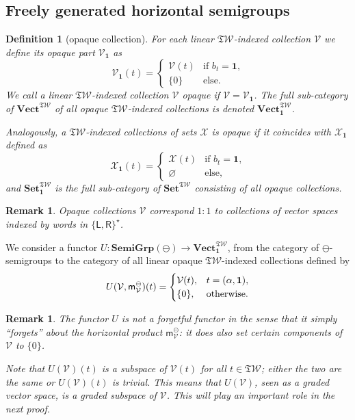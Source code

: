 \documentclass[pdftex]{sigma}
\newcommand{\SWc}{{\mathfrak{T}\mathcal{W}}}
\newcommand\hp{\mathsf{m}^{\ominus}}
\newcommand\LL{{\mathsf{L}}}
\newcommand\RR{{\mathsf{R}}}
\newcommand\CAT[1]{\mathbf{#1}}
\newcommand{\Vect}{\CAT{Vect}}
\newcommand{\Set}{\CAT{Set}}
\newcommand\sgominus{\CAT{SemiGrp}(\ominus)}
\newcommand\icsw{ \Vect^{\SWc} }
\numberwithin{equation}{section}
\newtheorem{Definition}[Theorem]{Definition}
\newtheorem{Remark}[Theorem]{Remark}
\begin{document}
\subsection{Freely generated horizontal semigroups}
\label{subsec:freely-generated-ominus-semigroups}

\begin{Definition}[opaque collection]
 For each linear $\SWc$-indexed collection $\mathcal V$ we define its {\it opaque part} $\mathcal V_{\mathbf 1}$ as
 \[\mathcal V_{\mathbf 1}(t)=
 \begin{cases}
 \mathcal V(t)&\text{if $b_t=\mathbf 1$,}\\
 \{0\} &\text{else.}
 \end{cases}
 \]
	We call a linear $\SWc$-indexed collection $\mathcal{V}$ {\it opaque} if
	$\mathcal V=\mathcal V_{\mathbf 1}$.
	The full sub-category of $\icsw$ of all opaque $\SWc$-indexed collections is denoted $\icsw_{\mathbf{1}}$.

 Analogously, a $\SWc$-indexed collections of sets $\mathcal X$ is opaque if it coincides with $\mathcal X_{\mathbf 1}$ defined as
 \[\mathcal X_{\mathbf 1}(t)=
 \begin{cases}
 \mathcal X(t)&\text{if $b_t=\mathbf 1$,}\\
 \varnothing &\text{else},
 \end{cases}
 \]
 and $\Set^\SWc_{\mathbf 1}$ is the full sub-category of $\Set^\SWc$ consisting of all opaque collections.
\end{Definition}
\begin{Remark}
 Opaque collections $\mathcal{V}$ correspond $1:1$ to collections of vector spaces indexed by words in $\{\LL,\RR\}^{\star}$.
\end{Remark}
We consider a functor $U\colon\sgominus\to \icsw_{\mathbf{1}}$, from the category of $\ominus$-semigroups to the category of all linear opaque $\SWc$-indexed collections defined by
\[
U(\mathcal{V}, \hp_{\mathcal{V}})(t)= \begin{cases} \mathcal{V} (t), & t=(\alpha,{\bf 1}), \\ \{0\}, & \text{otherwise}. \end{cases}
\]
\begin{Remark}
 \label{rmq:graded-subspace}
 The functor $U$ is not a forgetful functor in the sense that it simply ``forgets'' about the horizontal product $\hp_{\mathcal{V}}$: it does also set certain components of $\mathcal{V}$ to $\{0\}$.

 Note that $U(\mathcal V)(t)$ is a subspace of $\mathcal V(t)$ for all $t\in \SWc$; either the two are the same or $U(\mathcal V)(t)$ is trivial. This means that $U(\mathcal V)$, seen as a graded vector space, is a graded subspace of $\mathcal V$. This will play an important role in the next proof.
\end{Remark}
\end{document}
